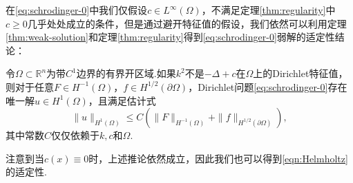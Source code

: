 在\eqref{eq:schrodinger-0}中我们仅假设$c\in L^{\infty}(\Omega)$，不满足定理\ref{thm:regularity}中$c\geq 0$几乎处处成立的条件，但是通过避开特征值的假设，我们依然可以利用定理\ref{thm:weak-solution}和定理\ref{thm:regularity}得到\eqref{eq:schrodinger-0}弱解的适定性结论：
\begin{corollary}\label{cor:Schrodinger-weak-solution}
令$\Omega\subset\mathbb{R}^n$为带$C^1$边界的有界开区域.如果$k^2$不是$-\Delta+c$在$\Omega$上的Dirichlet特征值，则对于任意$F\in H^{-1}(\Omega)$，$f\in H^{1/2}(\partial\Omega)$，Dirichlet问题\eqref{eq:schrodinger-0}存在唯一解$u\in H^1(\Omega)$，且满足估计式
\begin{equation}\label{eq:regularity-weak-solution}
\|u\|_{H^1(\Omega)} \leq C\left(\|F\|_{H^{-1}(\Omega)} +\|f\|_{H^{1/2}(\partial\Omega)} \right),
\end{equation}
其中常数$C$仅仅依赖于$k,c$和$\Omega$.
\end{corollary}
注意到当$c(x)\equiv 0$时，上述推论依然成立，因此我们也可以得到\eqref{eqn:Helmholtz}的适定性.

